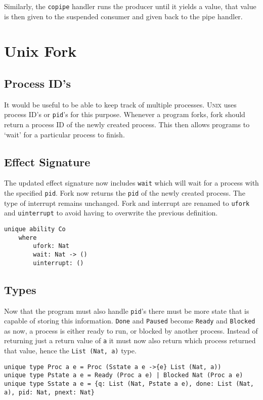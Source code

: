 \documentclass[logo,bsc,singlespacing,parskip]{infthesis}
\begin{document}
Similarly, the \texttt{copipe} handler runs the producer until it yields a
value, that value is then given to the suspended consumer and given back to the
pipe handler.

\section{Unix Fork}

\subsection{Process ID's}

It would be useful to be able to keep track of multiple processes.
\textsc{Unix} uses process ID's or \texttt{pid}'s for this purpose. Whenever a
program forks, fork should return a process ID of the newly created process. 
This then allows programs to `wait' for a particular process to finish.

\subsection{Effect Signature}

The updated effect signature now includes \texttt{wait} which will wait for a
process with the specified \texttt{pid}. Fork now returns the \texttt{pid} of
the newly created process. The type of interrupt remains unchanged. Fork and
interrupt are renamed to \texttt{ufork} and \texttt{uinterrupt} to avoid having
to overwrite the previous definition.

\begin{lstlisting}[language=unison]
unique ability Co 
    where 
        ufork: Nat
        wait: Nat -> ()
        uinterrupt: ()
\end{lstlisting}

\subsection{Types}

Now that the program must also handle \texttt{pid}'s there must be more state
that is capable of storing this information. \texttt{Done} and \texttt{Paused}
become \texttt{Ready} and \texttt{Blocked} as now, a process is either ready to
run, or blocked by another process. Instead of returning just a return value of
\texttt{a} it must now also return which process returned that value, hence the
\texttt{List (Nat, a)} type.

\begin{lstlisting}[language=unison]
unique type Proc a e = Proc (Sstate a e ->{e} List (Nat, a))
unique type Pstate a e = Ready (Proc a e) | Blocked Nat (Proc a e)
unique type Sstate a e = {q: List (Nat, Pstate a e), done: List (Nat, a), pid: Nat, pnext: Nat}
\end{lstlisting}
\end{document}
